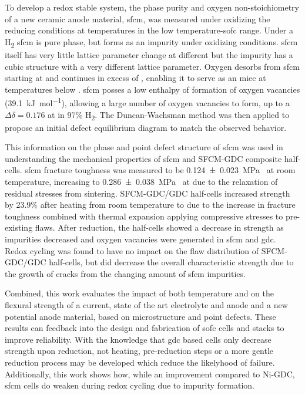 To develop a redox stable system, the phase purity and oxygen non-stoichiometry of a new ceramic anode material, \gls{sfcm}, was measured under oxidizing the reducing conditions at temperatures in the low temperature-\gls{sofc} range.
Under a H\textsubscript{2} \gls{sfcm} is pure phase, but forms  as an impurity under oxidizing conditions.
\Gls{sfcm} itself has very little lattice parameter change at different  but the impurity  has a cubic structure with a very different lattice parameter.
Oxygen desorbs from \Gls{sfcm} starting at  and continues in excess of , enabling it to serve as an \gls{miec} at temperatures below .
\Gls{sfcm} posses a low enthalpy of formation of oxygen vacancies (\SI{39.1}{\kilo\joule\per\mol}), allowing a large number of oxygen vacancies to form, up to a $\Delta\delta = 0.176$ at  in 97\% H\textsubscript{2}.
The Duncan-Wachsman method was then applied to propose an initial defect equilibrium diagram to match the observed behavior.

This information on the phase and point defect structure of \gls{sfcm} was used in understanding the mechanical properties of \gls{sfcm} and SFCM-GDC composite half-cells.
\Gls{sfcm} fracture toughness was measured to be \SI[separate-uncertainty = true]{0.124 +- 0.023}{\mega\pascal{}} at room temperature, increasing to \SI[separate-uncertainty = true]{0.286 +- 0.038}{\mega\pascal{}} at  due to the relaxation of residual stresses from sintering.
SFCM-GDC/GDC half-cells increased strength by 23.9\% after heating from room temperature to  due to the increase in fracture toughness combined with thermal expansion applying compressive stresses to pre-existing flaws.
After reduction, the half-cells showed a decrease in strength as impurities decreased and oxygen vacancies were generated in \gls{sfcm} and \gls{gdc}.
Redox cycling was found to have no impact on the flaw distribution of SFCM-GDC/GDC half-cells, but did decrease the overall characteristic strength due to the growth of cracks from the changing amount of \gls{sfcm} impurities.

Combined, this work evaluates the impact of both temperature and  on the flexural strength of a current, state of the art electrolyte and anode and a new potential anode material, based on microstructure and point defects.
These results can feedback into the design and fabrication of \gls{sofc} cells and stacks to improve reliability.
With the knowledge that \gls{gdc} based cells only decrease strength upon reduction, not heating, pre-reduction steps or a more gentle reduction process may be developed which reduce the likelyhood of failure.
Additionally, this work shows how, while an improvement compared to Ni-GDC, \gls{sfcm} cells do weaken during redox cycling due to impurity formation.


